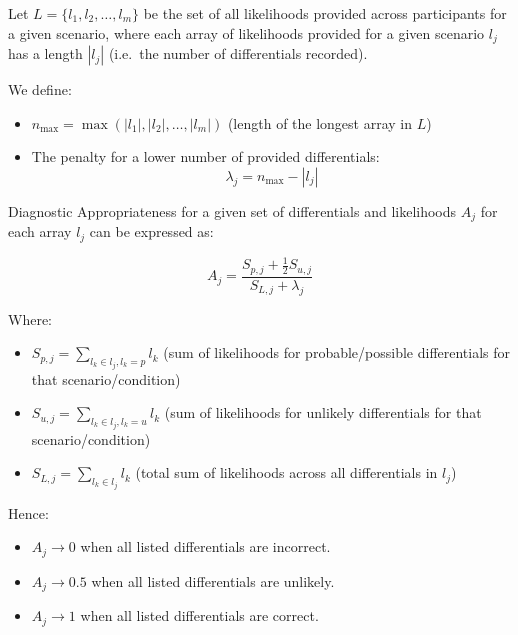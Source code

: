 \documentclass[a4paper, nobind]{templates/ociamthesis}
\begin{document}
\hfill\break
Let \(L = \{ l_1, l_2, \ldots, l_m \}\) be the set of all likelihoods provided across participants for a given scenario, where each array of likelihoods provided for a given scenario \(l_j\) has a length \(|l_j|\) (i.e.~the number of differentials recorded).

\hfill\break
We define:

\begin{itemize}
\item
  \(n_{\text{max}} = \max(|l_1|, |l_2|, \ldots, |l_m|)\) (length of the longest array in \(L\))
\item
  The penalty for a lower number of provided differentials: \[
  \lambda_j = n_{\text{max}} - |l_j|
  \]
\end{itemize}

Diagnostic Appropriateness for a given set of differentials and likelihoods \(A_j\) for each array \(l_j\) can be expressed as:

\[
A_j = \frac{S_{p,j} + \frac{1}{2} S_{u,j}}{S_{L,j} + \lambda_j}
\]

Where:

\begin{itemize}
\item
  \(S_{p,j} = \sum_{l_k \in l_j, l_k = p} l_k\) (sum of likelihoods for probable/possible differentials for that scenario/condition)
\item
  \(S_{u,j} = \sum_{l_k \in l_j, l_k = u} l_k\) (sum of likelihoods for unlikely differentials for that scenario/condition)
\item
  \(S_{L,j} = \sum_{l_k \in l_j} l_k\) (total sum of likelihoods across all differentials in \(l_j\))
\end{itemize}

Hence:

\begin{itemize}
\item
  \(A_j \to 0\) when all listed differentials are incorrect.
\item
  \(A_j \to 0.5\) when all listed differentials are unlikely.
\item
  \(A_j \to 1\) when all listed differentials are correct.
\end{itemize}
\end{document}
